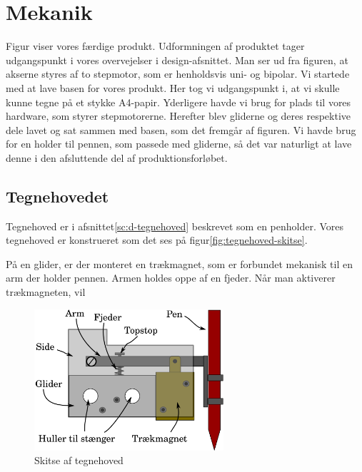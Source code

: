 \chapter[Implementering af mekanik]{Mekanik}


Figur  viser vores færdige
produkt.  Udformningen af produktet tager udgangspunkt i vores
overvejelser i design-afsnittet.  Man ser ud fra figuren, at akserne
styres af to stepmotor, som er henholdsvis uni- og bipolar.  Vi
startede med at lave basen for vores produkt. Her tog vi udgangspunkt
i, at vi skulle kunne tegne på et stykke A4-papir. Yderligere havde vi
brug for plads til vores hardware, som styrer stepmotorerne. Herefter
blev gliderne og deres respektive dele lavet og sat sammen med basen,
som det fremgår af figuren. Vi havde brug for en holder til pennen,
som passede med gliderne, så det var naturligt at lave denne i den
afsluttende del af produktionsforløbet.

\section{Tegnehovedet}
Tegnehoved er i afsnittet\vref{sc:d-tegnehoved} beskrevet som en
penholder. Vores tegnehoved er konstrueret som det ses på
figur\vref{fig:tegnehoved-skitse}.

På en glider, er der monteret en trækmagnet, som er forbundet mekanisk
til en arm der holder pennen. Armen holdes oppe af en fjeder. Når man
aktiverer trækmagneten, vil

\begin{figure}[htbp]
  \centering
  \includegraphics[width=7cm]{./img/tegnehoved-skitse}
  \caption{Skitse af tegnehoved}
  \label{fig:tegnehoved-skitse}
\end{figure}

